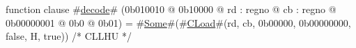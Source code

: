 function clause #\hyperref[zdecode]{decode}# (0b010010 @ 0b10000 @ rd : regno @ cb : regno @ 0b00000001 @ 0b0 @ 0b01) = #\hyperref[zSome]{Some}#(#\hyperref[zCLoad]{CLoad}#(rd, cb, 0b00000, 0b00000000, false, H, true)) /* CLLHU */
